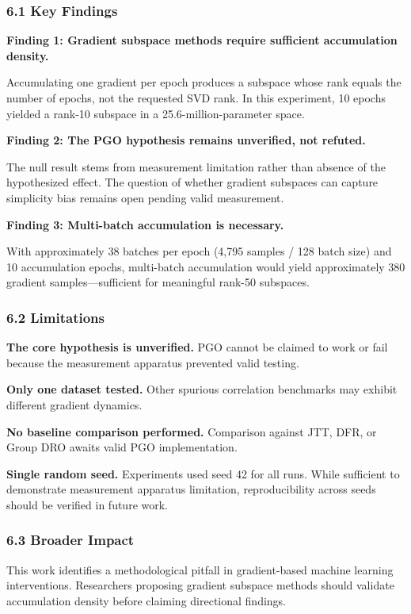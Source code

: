 
\subsubsection{6.1 Key Findings}

\textbf{Finding 1: Gradient subspace methods require sufficient accumulation density.}

Accumulating one gradient per epoch produces a subspace whose rank equals the number of epochs, not the requested SVD rank. In this experiment, 10 epochs yielded a rank-10 subspace in a 25.6-million-parameter space.

\textbf{Finding 2: The PGO hypothesis remains unverified, not refuted.}

The null result stems from measurement limitation rather than absence of the hypothesized effect. The question of whether gradient subspaces can capture simplicity bias remains open pending valid measurement.

\textbf{Finding 3: Multi-batch accumulation is necessary.}

With approximately 38 batches per epoch (4,795 samples / 128 batch size) and 10 accumulation epochs, multi-batch accumulation would yield approximately 380 gradient samples---sufficient for meaningful rank-50 subspaces.

\subsubsection{6.2 Limitations}

\textbf{The core hypothesis is unverified.} PGO cannot be claimed to work or fail because the measurement apparatus prevented valid testing.

\textbf{Only one dataset tested.} Other spurious correlation benchmarks may exhibit different gradient dynamics.

\textbf{No baseline comparison performed.} Comparison against JTT, DFR, or Group DRO awaits valid PGO implementation.

\textbf{Single random seed.} Experiments used seed 42 for all runs. While sufficient to demonstrate measurement apparatus limitation, reproducibility across seeds should be verified in future work.

\subsubsection{6.3 Broader Impact}

This work identifies a methodological pitfall in gradient-based machine learning interventions. Researchers proposing gradient subspace methods should validate accumulation density before claiming directional findings.

